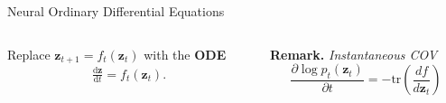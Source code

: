 \documentclass{beamer}
\begin{document}
\begin{frame}{Neural Ordinary Differential Equations \cite{chenNeuralOrdinaryDifferential}}
    \vspace*{-.25cm}
    \begin{columns}
        \begin{column}{0.59\linewidth}
        Replace \( \mathbf{z}_{t + 1} = f_t(\mathbf{z}_t) \) with the \textbf{ODE} 
        \begin{align*}
            \frac{\mathrm{d}\mathbf{z}}{\mathrm{d}t} = f_t(\mathbf{z}_t)
        .\end{align*}
        \end{column}
        \begin{column}{0.4\linewidth}
            \vspace{-.25cm}
            \begin{blackblock}
                \footnotesize
                \textbf{Remark.} \emph{Instantaneous COV}
                \[ \frac{\partial \log p_t(\mathbf{z}_t)}{\partial t} = -\text{tr}\left(\frac{df}{d\mathbf{z}_t}\right) \]
            \end{blackblock}
        \end{column}
    \end{columns}
    \vspace{.5cm}
\end{frame}
\end{document}
